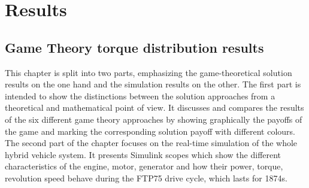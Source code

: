\chapter{Results}
\label{chp:results}

\section{Game Theory torque distribution results}
This chapter is split into two parts, emphasizing the game-theoretical solution results on the one hand and the simulation results on the other. The first part is intended to show the distinctions between the solution approaches from a theoretical and mathematical point of view. It discusses and compares the results of the six different game theory approaches by showing graphically the payoffs of the game and marking the corresponding solution payoff with different colours. The second part of the chapter focuses on the real-time simulation of the whole hybrid vehicle system. It presents Simulink scopes which show the different characteristics of the engine, motor, generator and how their power, torque, revolution speed behave during the FTP75 drive cycle, which lasts for 1874s.


